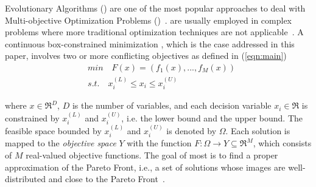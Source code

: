  Evolutionary Algorithms (\MOEAS{}) are one of the most popular approaches 
to deal with Multi-objective Optimization Problems (\MOPS{})~\cite{das2011real, zhou2011multiobjective}.
%
\MOEAS{} are usually employed in complex problems where more traditional optimization techniques are not 
applicable~\cite{Lootsma:99}.
%
A continuous box-constrained minimization \MOP{}, which is the case addressed in this paper,
involves two or more conflicting objectives as defined in (\ref{eqn:main})
%
\begin{equation}\label{eqn:main}
\begin{split}
&min \quad F(x) = (f_1(x), ..., f_M(x)) \\
&s.t. \quad x_i^{(L)} \leq x_i \leq x_i^{(U)}
\end{split}
\end{equation}

where $x \in \Re^D$, $D$ is the number of variables,
and each decision variable $x_i \in \Re$ is constrained by $x_i^{(L)}$ and $x_i^{(U)}$, 
i.e. the lower bound and the upper bound.
The feasible space bounded by $x_i^{(L)}$ and $x_i^{(U)}$ is denoted by $\Omega$.
Each solution is mapped to the \textit{objective space} $Y$ with the function $F: \Omega \rightarrow Y \subseteq \Re^M$, 
which consists of $M$ real-valued objective functions.
%
%
%
%
%
%
The goal of most \MOEAS{} is to find a proper approximation of the Pareto Front, i.e., a set of
solutions whose images are well-distributed and close to the Pareto Front~\cite{trivedi2016survey}.
%

